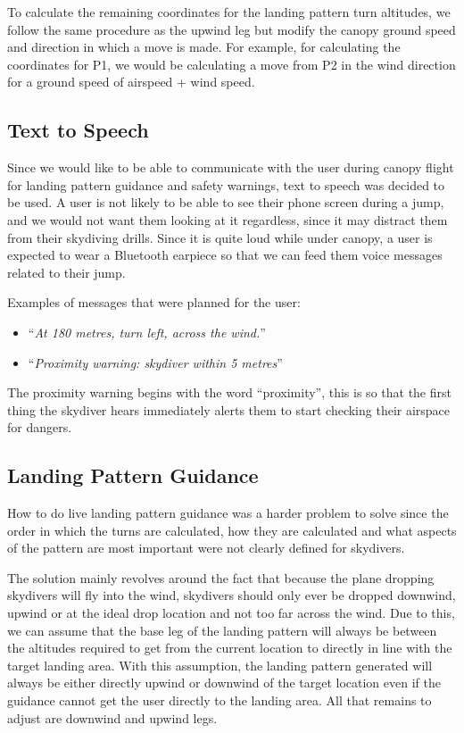 To calculate the remaining coordinates for the landing pattern turn altitudes, we follow the same procedure as the upwind leg but modify the canopy ground speed and direction in which a move is made. For example, for calculating the coordinates for P1, we would be calculating a move from P2 in the wind direction for a ground speed of airspeed + wind speed.

\subsection{Text to Speech}
Since we would like to be able to communicate with the user during canopy flight for landing pattern guidance and safety warnings, text to speech was decided to be used. A user is not likely to be able to see their phone screen during a jump, and we would not want them looking at it regardless, since it may distract them from their skydiving drills. Since it is quite loud while under canopy, a user is expected to wear a Bluetooth earpiece so that we can feed them voice messages related to their jump.

Examples of messages that were planned for the user:
\begin{itemize}
  \item ``\textit{At 180 metres, turn left, across the wind.}''
  \item ``\textit{Proximity warning: skydiver within 5 metres}''
\end{itemize}

The proximity warning begins with the word ``proximity'', this is so that the first thing the skydiver hears immediately alerts them to start checking their airspace for dangers.

\subsection{Landing Pattern Guidance}
How to do live landing pattern guidance was a harder problem to solve since the order in which the turns are calculated, how they are calculated and what aspects of the pattern are most important were not clearly defined for skydivers.

The solution mainly revolves around the fact that because the plane dropping skydivers will fly into the wind, skydivers should only ever be dropped downwind, upwind or at the ideal drop location and not too far across the wind. Due to this, we can assume that the base leg of the landing pattern will always be between the altitudes required to get from the current location to directly in line with the target landing area. With this assumption, the landing pattern generated will always be either directly upwind or downwind of the target location even if the guidance cannot get the user directly to the landing area. All that remains to adjust are downwind and upwind legs.

